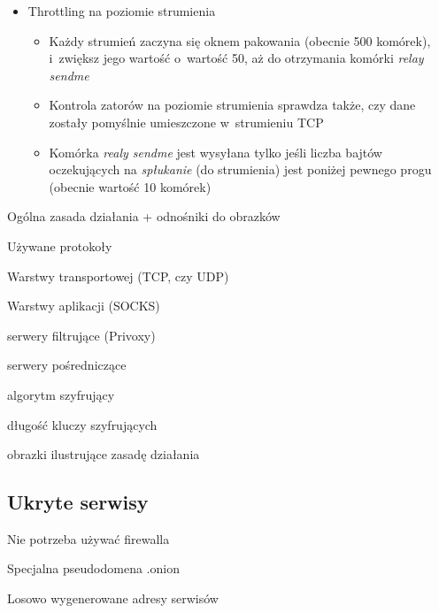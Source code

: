 \begin{description}
\begin{itemize}
\begin{itemize}
\begin{enumerate}
      \end{enumerate}
    \end{itemize}
    \item Throttling na poziomie strumienia
    \begin{itemize}
      \item Każdy strumień zaczyna się oknem pakowania (obecnie 500 komórek), i~zwiększ jego wartość o~wartość 50, aż do otrzymania komórki \textit{relay sendme} 
      \item  Kontrola zatorów na poziomie strumienia sprawdza także, czy dane zostały pomyślnie umieszczone w~strumieniu TCP
      \item Komórka \textit{realy sendme} jest wysyłana tylko jeśli liczba bajtów oczekujących na \textit{spłukanie} (do strumienia) jest poniżej pewnego progu (obecnie wartość 10 komórek)
    \end{itemize}
  \end{itemize}
\end{description}
   
\begin{description}
 \item Ogólna zasada działania + odnośniki do obrazków
 \item Używane protokoły
 \begin{description}
  \item Warstwy transportowej (TCP, czy UDP)
  \item Warstwy aplikacji (SOCKS)
  \item 
 \end{description}
 \item serwery filtrujące (Privoxy)
 \item serwery pośredniczące
 \item algorytm szyfrujący
 \item długość kluczy szyfrujących
 \item obrazki ilustrujące zasadę działania
\end{description}

\subsection{Ukryte serwisy}
\begin{description}
 \item Nie potrzeba używać firewalla
 \item Specjalna pseudodomena .onion
 \item Losowo wygenerowane adresy serwisów
\end{description}

